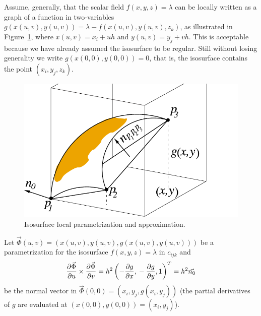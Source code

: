 Assume, generally, that the scalar field $f(x,y,z)=\lambda$ can be
locally written as a graph of a function in two-variables
$g(x(u,v),y(u,v))=\lambda-f(x(u,v),y(u,v),z_k)$, as illustrated in
Figure~\ref{fig:graphfunct}, where $x(u,v) = x_i+uh$ and
$y(u,v)=y_j+vh$. This is acceptable because we have already assumed
the isosurface to be regular. Still without losing generality we
write $g(x(0,0),y(0,0)) = 0$, that is, the isosurface
contains the point $(x_i,y_j,z_k)$.
\begin{figure}[h]
  \centering
  \includegraphics[width=0.40\linewidth,keepaspectratio=true]{chapter2/figures/gridcell.pdf}
  \caption{Isosurface local parametrization and approximation.}
  \label{fig:graphfunct}
\end{figure}
 Let  $\vec{\Phi}(u,v) = (x(u,v),y(u,v),g(x(u,v),y(u,v)))$ be a parametrization 
for the isosurface $f(x,y,z)=\lambda$ in $c_{ijk}$ and
\begin{equation}
\frac{\partial\vec{\Phi}}{\partial u}\times\frac{\partial\vec{\Phi}}{\partial v} = 
h^2\left(-\frac{\partial g}{\partial x},\\
	     -\frac{\partial g}{\partial y},\\ 
	     1\right)^T = h^2 \vec{n_0}
\label{eq:normal_exact}
\end{equation}
\noindent be the normal vector in $\vec{\Phi}(0,0)=(x_i,y_j,g(x_i,y_j))$ 
(the partial derivatives of $g$ are evaluated at $(x(0,0),y(0,0))=(x_i,y_j)$).

